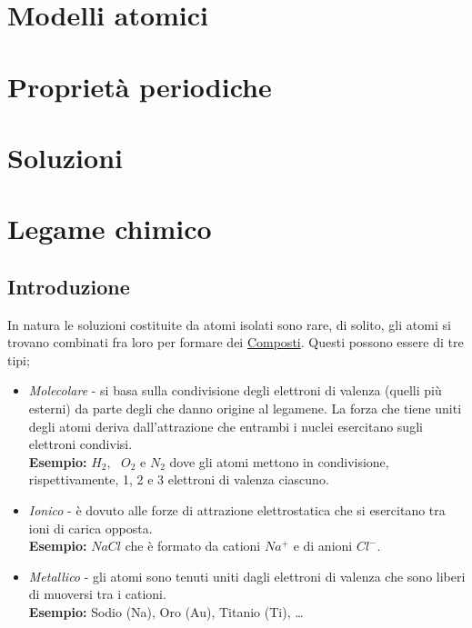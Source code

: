 \documentclass{book}
\begin{document}
\chapter{Modelli atomici}

\chapter{Proprietà periodiche}

\chapter{Soluzioni}

\chapter{Legame chimico}
\section{Introduzione}
In natura le soluzioni costituite da atomi isolati sono rare, di solito, gli
atomi si trovano combinati fra loro per formare dei \underline{Composti}.
Questi possono essere di tre tipi; 
\begin{itemize}
	\item \textit{Molecolare} - si basa sulla condivisione degli elettroni di
		valenza (quelli più esterni) da parte degli che danno origine al
		legamene. La forza che tiene uniti degli atomi deriva dall'attrazione
		che entrambi i nuclei esercitano sugli elettroni condivisi.\\
		\textbf{Esempio:} $H_2,\text{ }O_2 \text{ e } N_2$ dove gli atomi
		mettono in condivisione, rispettivamente, 1, 2 e 3 elettroni di valenza
		ciascuno.
	\item \textit{Ionico} - è dovuto alle forze di attrazione elettrostatica
		che si esercitano tra ioni di carica opposta.\\
		\textbf{Esempio:} $NaCl$ che è formato da cationi $Na^+$ e di anioni
		$Cl^-$.
	\item \textit{Metallico} - gli atomi sono tenuti uniti dagli elettroni di
		valenza che sono liberi di muoversi tra i cationi.\\
		\textbf{Esempio:} Sodio (Na), Oro (Au), Titanio (Ti), \dots
\end{itemize}
\end{document}
